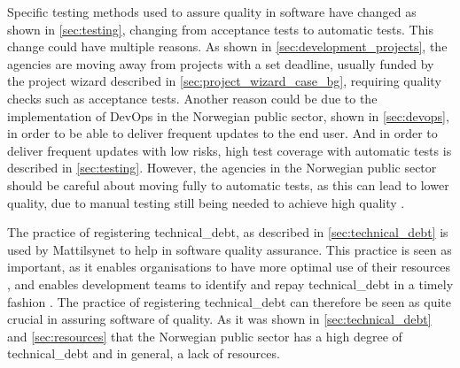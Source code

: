 Specific testing methods used to assure quality in software have changed as shown in \autoref{sec:testing}, changing from acceptance tests to automatic tests. This change could have multiple reasons. As shown in \autoref{sec:development_projects}, the agencies are moving away from projects with a set deadline, usually funded by the project wizard described in \autoref{sec:project_wizard_case_bg}, requiring quality checks such as acceptance tests. Another reason could be due to the implementation of DevOps in the Norwegian public sector, shown in \autoref{sec:devops}, in order to be able to deliver frequent updates to the end user. And in order to deliver frequent updates with low risks, high test coverage with automatic tests is described in \autoref{sec:testing}. However, the agencies in the Norwegian public sector should be careful about moving fully to automatic tests, as this can lead to lower quality, due to manual testing still being needed to achieve high quality \cite{dsc_2019}. 


The practice of registering \gls{technical_debt}, as described in \autoref{sec:technical_debt} is used by Mattilsynet to help in software quality assurance. This practice is seen as important, as it enables organisations to have more optimal use of their resources \cite{mv_2022}, and enables development teams to identify and repay \gls{technical_debt} in a timely fashion \cite{mv_2022}. The practice of registering \gls{technical_debt} can therefore be seen as quite crucial in assuring software of quality. As it was shown in \autoref{sec:technical_debt} and \autoref{sec:resources} that the Norwegian public sector has a high degree of \gls{technical_debt} and in general, a lack of resources.

